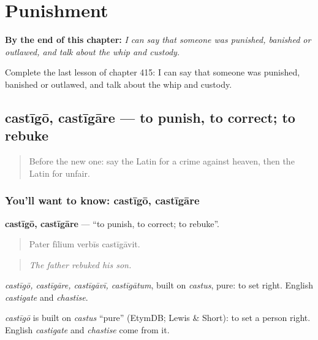 
\chapter{Punishment}
\label{ch:la-punishment}

\begin{chapteropening}
\textbf{By the end of this chapter:} \emph{I can say that someone was punished, banished or outlawed, and talk about the whip and custody.}

Complete the last lesson of chapter 415: I can say that someone was punished, banished or outlawed, and talk about the whip and custody.
\end{chapteropening}

\section[castīgō, castīgāre]{castīgō, castīgāre — to punish, to correct; to rebuke}

\label{lesson:LA-C415-castigo}



\begin{quote}
Before the new one: say the Latin for a crime against heaven, then the Latin for unfair.
\end{quote}

\subsection*{You'll want to know: castīgō, castīgāre}
\textbf{castīgō, castīgāre} — \textquotedblleft{}to punish, to correct; to rebuke\textquotedblright{}.

\begin{quote}
Pater fīlium verbīs castīgāvit.
\end{quote}

\begin{quote}
\emph{The father rebuked his son.}
\end{quote}

\emph{castīgō, castīgāre, castīgāvī, castīgātum}, built on \emph{castus}, pure: to set right. English \emph{castigate} and \emph{chastise}.

\begin{cousinweb}
\emph{castīgō} is built on \emph{castus} \textquotedblleft{}pure\textquotedblright{} (EtymDB; Lewis \& Short): to set a person right. English \emph{castigate} and \emph{chastise} come from it.
\end{cousinweb}

